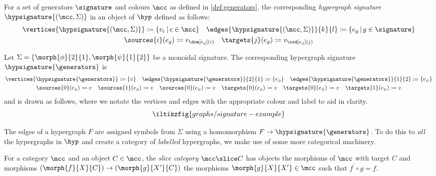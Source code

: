 \begin{definition}
    For a set of generators \(\signature\) and colours \(\mcc\) as defined
    in \cref{def:generators}, the corresponding \emph{hypergraph signature}
    \(\hypsignature{(\mcc,\Sigma)}\) in an object of \(\hyp\) defined as
    follows:
    \begin{gather*}
        \vertices{\hypsignature{(\mcc,\Sigma)}} \coloneqq \{ v_c \,|\, c \in \mcc\}
        \quad
        \edges{\hypsignature{(\mcc,\Sigma)}}{k}{l} \coloneqq \{ e_g \,|\, g \in \signature\}
        \\
        \sources{i}(e_g) \coloneqq v_{\dom[e_g](i)}
        \quad
        \targets{j}(e_g) \coloneqq v_{\cod[e_g](j)}
    \end{gather*}
\end{definition}

\begin{example}\label{ex:labelled-hypergraph-signature}
    Let \(\Sigma = \{\morph{\phi}{2}{1}, \morph{\psi}{1}{2}\}\) be a monoidal
    signature.
    The corresponding hypergraph signature \(\hypsignature{\generators}\) is
    \begin{gather*}
        \vertices{\hypsignature{\generators}} \coloneqq \{v\}
        \quad
        \edges{\hypsignature{\generators}}{2}{1} \coloneqq \{e_\phi\}
        \quad
        \edges{\hypsignature{\generators}}{1}{2} \coloneqq \{e_\psi\}
        \\
        \sources{0}(e_\phi) \coloneqq v
        \quad
        \sources{1}(e_\phi) \coloneqq v
        \quad
        \sources{0}(e_\psi) \coloneqq v
        \quad
        \targets{0}(e_\phi) \coloneqq v
        \quad
        \targets{0}(e_\psi) \coloneqq v
        \quad
        \targets{1}(e_\psi) \coloneqq v
    \end{gather*}
    and is drawn as follows, where we notate the vertices and edges with the
    appropriate colour and label to aid in clarity.
    \[
        \iltikzfig{graphs/signature-example}
    \]
\end{example}

The edges of a hypergraph \(F\) are assigned symbols from \(\Sigma\) using a
homomorphism \(F \to \hypsignature{\generators}\).
To do this to \emph{all} the hypergraphs in \(\hyp\) and create a category of
\emph{labelled} hypergraphs, we make use of some more categorical machinery.

\begin{definition}
    For a category \(\mcc\) and an object \(C \in \mcc\), the
    \emph{slice category} \(\mcc \slice C\) has objects the morphisms of
    \(\mcc\) with target \(C\) and morphisms
    \((\morph{f}{X}{C}) \to (\morph{g}{X^\prime}{C})\) the morphisms
    \(\morph{g}{X}{X^\prime} \in \mcc\) such that \(f^\prime\circ g = f\).
\end{definition}

